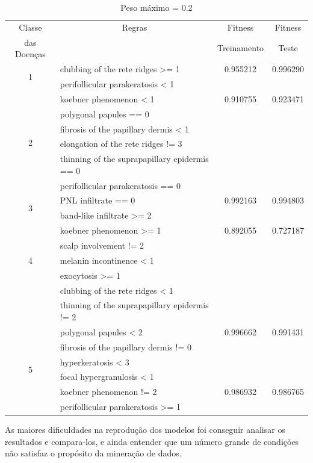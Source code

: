 \documentclass[11pt]{article}
\begin{document}
\begin{table}[h]
  \centering
  \begin{tabular}{|c|l|c|c|}
    \hline
    Classe & \multicolumn{1}{c|}{Regras}  & Fitness & Fitness\\
    das Doenças &  & Treinamento & Teste\\
    \hline
    \multirow{2}{*}{1} & clubbing of the rete ridges >= 1 & 0.955212 & 0.996290 \\
    & perifollicular parakeratosis < 1  & &\\
    \hline
    \multirow{6}{*}{2} & koebner phenomenon  < 1 & 0.910755 &  0.923471 \\
    & polygonal papules  == 0 & &\\
    & fibrosis of the papillary dermis < 1 & &\\
    & elongation of the rete ridges != 3 & &\\
    & thinning of the suprapapillary epidermis == 0 & &\\
    & perifollicular parakeratosis == 0 & &\\
    \hline
    \multirow{2}{*}{3} & PNL infiltrate == 0  & 0.992163 &0.994803\\
    & band-like infiltrate >= 2 & &\\
    \hline
    \multirow{5}{*}{4} & koebner phenomenon  >= 1 & 0.892055 &  0.727187  \\
    & scalp involvement != 2 & &\\
    & melanin incontinence < 1 & &\\
    & exocytosis >= 1  & &\\
    & clubbing of the rete ridges < 1  & &\\
    & thinning of the suprapapillary epidermis != 2   & &\\
    \hline
    \multirow{6}{*}{5} & polygonal papules  < 2  & 0.996662 & 0.991431 \\
    & fibrosis of the papillary dermis != 0  & &\\
    &  hyperkeratosis < 3  & &\\
    & focal hypergranulosis < 1 & &\\
    \hline
    \multirow{2}{*}{6} & koebner phenomenon  != 2  & 0.986932 & 0.986765 \\
    & perifollicular parakeratosis >= 1 & &\\
    \hline
  \end{tabular}
  \caption{Peso máximo = 0.2}
  \label{tab:etapa2-1}
\end{table}

As maiores dificuldades na reprodução dos modelos foi conseguir analisar os
resultados e compara-los, e ainda entender que um número grande de condições
não satisfaz o propósito da mineração de dados.

\nocite{*}


\end{document}
